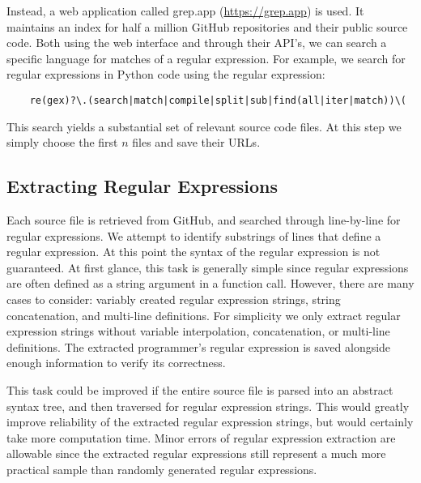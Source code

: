 Instead, a web application called grep.app (\url{https://grep.app}) is used. It maintains an index for half a million GitHub repositories and their public source code. Both using the web interface and through their API's, we can search a specific language for matches of a regular expression. For example, we search for regular expressions in Python code using the regular expression: 
\begin{center}
  \begin{verbatim}
    re(gex)?\.(search|match|compile|split|sub|find(all|iter|match))\(
  \end{verbatim}
\end{center}
This search yields a substantial set of relevant source code files. At this step we simply choose the first $n$ files and save their URLs.


\subsection{Extracting Regular Expressions}
\label{subsec:Extracting Regular Expressions}
Each source file is retrieved from GitHub, and searched through line-by-line for regular expressions. We attempt to identify substrings of lines that define a regular expression. At this point the syntax of the regular expression is not guaranteed. At first glance, this task is generally simple since regular expressions are often defined as a string argument in a function call. However, there are many cases to consider: variably created regular expression strings, string concatenation, and multi-line definitions. For simplicity we only extract regular expression strings without variable interpolation, concatenation, or multi-line definitions. The extracted programmer's regular expression is saved alongside enough information to verify its correctness.

This task could be improved if the entire source file is parsed into an abstract syntax tree, and then traversed for regular expression strings. This would greatly improve reliability of the extracted regular expression strings, but would certainly take more computation time. Minor errors of regular expression extraction are allowable since the extracted regular expressions still represent a much more practical sample than randomly generated regular expressions.


